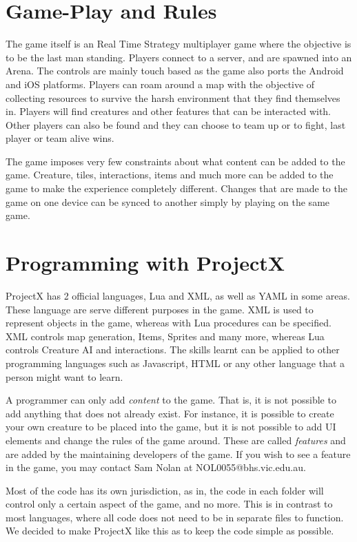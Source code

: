 \documentclass{book}
\begin{document}
	\section{Game-Play and Rules}
	The game itself is an Real Time Strategy multiplayer game where the objective is to be the last man standing. Players connect to a server, and are spawned into an Arena. The controls are mainly touch based as the game also ports the Android and iOS platforms. Players can roam around a map with the objective of collecting resources to survive the harsh environment that they find themselves in. Players will find creatures and other features that can be interacted with. Other players can also be found and they can choose to team up or to fight, last player or team alive wins.
	
	The game imposes very few constraints about what content can be added to the game. Creature, tiles, interactions, items and much more can be added to the game to make the experience completely different. Changes that are made to the game on one device can be synced to another simply by playing on the same game.
	
	\section{Programming with ProjectX}
	ProjectX has 2 official languages, Lua and XML, as well as YAML in some areas. These language are serve different purposes in the game. XML is used to represent objects in the game, whereas with Lua procedures can be specified. XML controls map generation, Items, Sprites and many more, whereas Lua controls Creature AI and interactions. The skills learnt can be applied to other programming languages such as Javascript, HTML or any other language that a person might want to learn.
	
	A programmer can only add \textit{content} to the game. That is, it is not possible to add anything that does not already exist. For instance, it is possible to create your own creature to be placed into the game, but it is not possible to add UI elements and change the rules of the game around. These are called \textit{features} and are added by the maintaining developers of the game. If you wish to see a feature in the game, you may contact Sam Nolan at NOL0055@bhs.vic.edu.au.
	
	Most of the code has its own jurisdiction, as in, the code in each folder will control only a certain aspect of the game, and no more. This is in contrast to most languages, where all code does not need to be in separate files to function. We decided to make ProjectX like this as to keep the code simple as possible.
	
\end{document}
